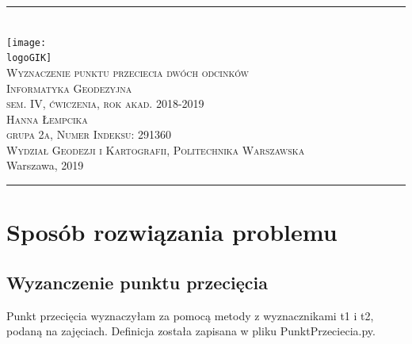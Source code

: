 \documentclass[10pt,a4paper]{article}
\newcommand{\logoGIK}{WGiK-znak.png}
\newcommand{\authorName}{Hanna Łempcika  \\ grupa 2a, Numer Indeksu: 291360}
\newcommand{\titeReport}{Wyznaczenie punktu przeciecia dwóch odcinków} %
\newcommand{\titleLecture}{Informatyka Geodezyjna \\ sem. IV, ćwiczenia, rok akad. 2018-2019} %
\newcommand{\faculty}{Wydział Geodezji i Kartografii}
\newcommand{\university}{Politechnika Warszawska}
\newcommand{\city}{Warszawa}
\newcommand{\thisyear}{2019}
\begin{document}
	\begin{center} 
		\rule{\textwidth}{.5pt} \\
		\vspace{1.0cm}
		\texttt{[image: \\logoGIK]}
		\vspace{0.5cm} \\
		\Large \textsc{\titeReport}
		\vspace{0.5cm} \\  
		\large \textsc{\titleLecture}
		\vspace{0.5cm}\\
		\textsc{\authorName}  \\
		\textsc{\faculty}, \textsc{\university}  \\ 
		\city, \thisyear
	\end{center} 
	\rule{\textwidth}{1.5pt}
	
	\tableofcontents 								%
	

\newpage
\section{Sposób rozwiązania problemu}

\subsection{Wyzanczenie punktu przecięcia}
Punkt przecięcia wyznaczyłam za pomocą metody z wyznacznikami t1 i t2, podaną na zajęciach. Definicja została zapisana w pliku PunktPrzeciecia.py.
\end{document}
